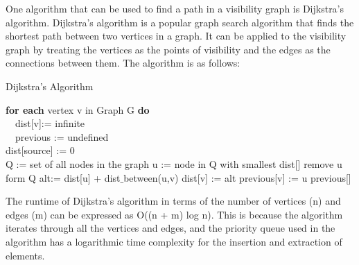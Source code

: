 \documentclass[a4 paper]{article}
\begin{document}
\begin{enumerate}
\begin{description}[font=$\bullet$\scshape\bfseries]
           
           One algorithm that can be used to find a path in a visibility graph is Dijkstra's algorithm. Dijkstra's algorithm is a popular graph search algorithm that finds the shortest path between two vertices in a graph. It can be applied to the visibility graph by treating the vertices as the points of visibility and the edges as the connections between them. The algorithm is as follows: \\
           {\centering 
\begin{minipage}{\linewidth}
\begin{algorithm}[H]
\caption{Dijkstra's Algorithm}
    \begin{algorithmic}
        \item \textbf{for each} vertex v in Graph G
        \textbf{do} \\
            \ \  dist[v]:= infinite \\
            \ \ previous := undefined \\
            dist[source] := 0 \\
            Q := set of all nodes in the graph
                \State u := node in Q with smallest dist[]
                \State remove u form Q
                    \State alt:= dist[u] + dist$\_$between(u,v)
                            \State dist[v] := alt
                            \State previous[v] := u
                        \EndIf
                \EndFor
            \Return previous[]
            \EndWhile
    \end{algorithmic}
\end{algorithm}
\end{minipage}
}
The runtime of Dijkstra's algorithm in terms of the number of vertices (n) and edges (m) can be expressed as O((n + m) log n). This is because the algorithm iterates through all the vertices and edges, and the priority queue used in the algorithm has a logarithmic time complexity for the insertion and extraction of elements. 
        \end{description}

\end{enumerate}
\end{document}
